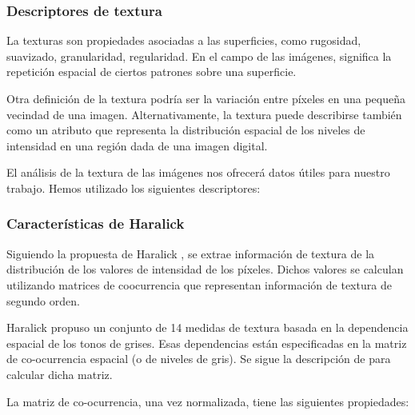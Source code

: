 \subsubsection{Descriptores de textura}
La texturas son propiedades asociadas a las superficies, como rugosidad, suavizado, granularidad, regularidad. En el campo de las imágenes, significa la repetición espacial de ciertos patrones sobre una superficie.

Otra definición de la textura podría ser la variación entre píxeles en una pequeña vecindad de una imagen. Alternativamente, la textura puede describirse también como un atributo que representa la distribución espacial de los niveles de intensidad en una región dada de una imagen digital.


El análisis de la textura de las imágenes nos ofrecerá datos útiles para nuestro trabajo. Hemos utilizado los siguientes descriptores:

\subsubsection*{Características de Haralick}
Siguiendo la propuesta de Haralick \cite{haralick1992computer}, se extrae información de textura de la distribución de los valores de intensidad de los píxeles. Dichos valores se calculan utilizando matrices de coocurrencia que representan información de textura de segundo orden.

Haralick propuso un conjunto de 14 medidas de textura basada en la dependencia espacial de los tonos de grises. Esas dependencias están especificadas en la matriz de co-ocurrencia espacial (o de niveles de gris). Se sigue la descripción de \cite{presutti2004matriz} para calcular dicha matriz.

La matriz de co-ocurrencia, una vez normalizada, tiene las siguientes propiedades:

